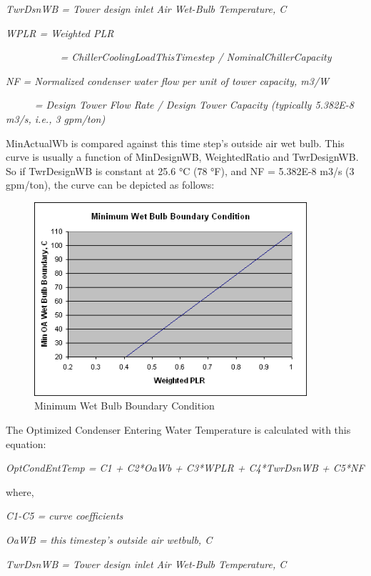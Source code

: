 \emph{TwrDsnWB = Tower design inlet Air Wet-Bulb Temperature, C}

\emph{WPLR = Weighted PLR}

\emph{~~~~~~~~~~ = ChillerCoolingLoadThisTimestep / NominalChillerCapacity}

\emph{NF = Normalized condenser water flow per unit of tower capacity, m3/W}

\emph{~~~~~ = Design Tower Flow Rate / Design Tower Capacity (typically 5.382E-8 m3/s, i.e., 3 gpm/ton)}

MinActualWb is compared against this time step's outside air wet bulb. This curve is usually a function of MinDesignWB, WeightedRatio and TwrDesignWB. So if TwrDesignWB is constant at 25.6 °C (78 °F), and NF = 5.382E-8 m3/s (3 gpm/ton), the curve can be depicted as follows:

\begin{figure}[hbtp] %
\centering
\includegraphics[width=0.9\textwidth, height=0.9\textheight, keepaspectratio=true]{media/image6483.png}
\caption{Minimum Wet Bulb Boundary Condition \protect \label{fig:minimum-wet-bulb-boundary-condition}}
\end{figure}

The Optimized Condenser Entering Water Temperature is calculated with this equation:

\emph{OptCondEntTemp = C1 + C2*OaWb + C3*WPLR + C4*TwrDsnWB + C5*NF}

where,

\emph{C1-C5 = curve coefficients}

\emph{OaWB = this timestep's outside air wetbulb, C}

\emph{TwrDsnWB = Tower design inlet Air Wet-Bulb Temperature, C}

